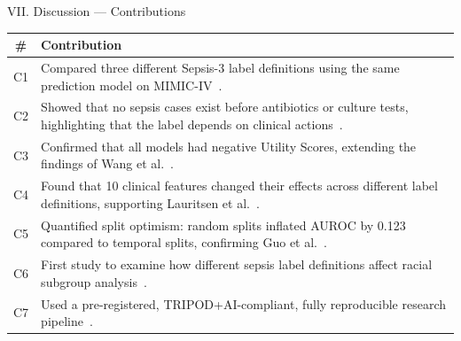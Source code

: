 \documentclass[aspectratio=169,10pt]{beamer}
\newcommand{\tablestyle}{%
  \renewcommand{\arraystretch}{1.2}%
  \small%
}
\begin{document}
\begin{frame}{VII. Discussion --- Contributions}
\tablestyle
\begin{center}
\begin{tabular}{cp{12cm}}
\toprule
\textbf{\#} & \textbf{Contribution} \\
\midrule
C1 & Compared three different Sepsis-3 label definitions using the same prediction model on MIMIC-IV~\cite{cohen2024subtle}. \\
C2 & Showed that no sepsis cases exist before antibiotics or culture tests, highlighting that the label depends on clinical actions~\cite{kamran2024evaluation}. \\
C3 & Confirmed that all models had negative Utility Scores, extending the findings of Wang et al.~\cite{wang2025srpm}. \\
C4 & Found that 10 clinical features changed their effects across different label definitions, supporting Lauritsen et al.~\cite{lauritsen2021framing}. \\
C5 & Quantified split optimism: random splits inflated AUROC by 0.123 compared to temporal splits, confirming Guo et al.~\cite{guo2022temporal}. \\
C6 & First study to examine how different sepsis label definitions affect racial subgroup analysis~\cite{wang2022equity}. \\
C7 & Used a pre-registered, TRIPOD+AI-compliant, fully reproducible research pipeline~\cite{collins2024tripodai}. \\
\bottomrule
\end{tabular}
\end{center}
\end{frame}
\end{document}
